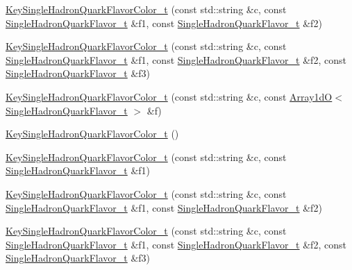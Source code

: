 \begin{DoxyCompactItemize}
\item 
\mbox{\hyperlink{structHadron_1_1KeySingleHadronQuarkFlavorColor__t_a1a1acbb421e0eee78a6102a9dc7027b6}{Key\+Single\+Hadron\+Quark\+Flavor\+Color\+\_\+t}} (const std\+::string \&c, const \mbox{\hyperlink{structHadron_1_1SingleHadronQuarkFlavor__t}{Single\+Hadron\+Quark\+Flavor\+\_\+t}} \&f1, const \mbox{\hyperlink{structHadron_1_1SingleHadronQuarkFlavor__t}{Single\+Hadron\+Quark\+Flavor\+\_\+t}} \&f2)
\item 
\mbox{\hyperlink{structHadron_1_1KeySingleHadronQuarkFlavorColor__t_aa59b67de7070dc5fcab6ef768af7069e}{Key\+Single\+Hadron\+Quark\+Flavor\+Color\+\_\+t}} (const std\+::string \&c, const \mbox{\hyperlink{structHadron_1_1SingleHadronQuarkFlavor__t}{Single\+Hadron\+Quark\+Flavor\+\_\+t}} \&f1, const \mbox{\hyperlink{structHadron_1_1SingleHadronQuarkFlavor__t}{Single\+Hadron\+Quark\+Flavor\+\_\+t}} \&f2, const \mbox{\hyperlink{structHadron_1_1SingleHadronQuarkFlavor__t}{Single\+Hadron\+Quark\+Flavor\+\_\+t}} \&f3)
\item 
\mbox{\hyperlink{structHadron_1_1KeySingleHadronQuarkFlavorColor__t_aa894166327f6565a8ec49fd863dadf47}{Key\+Single\+Hadron\+Quark\+Flavor\+Color\+\_\+t}} (const std\+::string \&c, const \mbox{\hyperlink{classADAT_1_1Array1dO}{Array1dO}}$<$ \mbox{\hyperlink{structHadron_1_1SingleHadronQuarkFlavor__t}{Single\+Hadron\+Quark\+Flavor\+\_\+t}} $>$ \&f)
\item 
\mbox{\hyperlink{structHadron_1_1KeySingleHadronQuarkFlavorColor__t_acd4b45c7be8c3465db55bcddff1c4617}{Key\+Single\+Hadron\+Quark\+Flavor\+Color\+\_\+t}} ()
\item 
\mbox{\hyperlink{structHadron_1_1KeySingleHadronQuarkFlavorColor__t_ab47ad45a431348bc0ac3c90a670a440a}{Key\+Single\+Hadron\+Quark\+Flavor\+Color\+\_\+t}} (const std\+::string \&c, const \mbox{\hyperlink{structHadron_1_1SingleHadronQuarkFlavor__t}{Single\+Hadron\+Quark\+Flavor\+\_\+t}} \&f1)
\item 
\mbox{\hyperlink{structHadron_1_1KeySingleHadronQuarkFlavorColor__t_a1a1acbb421e0eee78a6102a9dc7027b6}{Key\+Single\+Hadron\+Quark\+Flavor\+Color\+\_\+t}} (const std\+::string \&c, const \mbox{\hyperlink{structHadron_1_1SingleHadronQuarkFlavor__t}{Single\+Hadron\+Quark\+Flavor\+\_\+t}} \&f1, const \mbox{\hyperlink{structHadron_1_1SingleHadronQuarkFlavor__t}{Single\+Hadron\+Quark\+Flavor\+\_\+t}} \&f2)
\item 
\mbox{\hyperlink{structHadron_1_1KeySingleHadronQuarkFlavorColor__t_aa59b67de7070dc5fcab6ef768af7069e}{Key\+Single\+Hadron\+Quark\+Flavor\+Color\+\_\+t}} (const std\+::string \&c, const \mbox{\hyperlink{structHadron_1_1SingleHadronQuarkFlavor__t}{Single\+Hadron\+Quark\+Flavor\+\_\+t}} \&f1, const \mbox{\hyperlink{structHadron_1_1SingleHadronQuarkFlavor__t}{Single\+Hadron\+Quark\+Flavor\+\_\+t}} \&f2, const \mbox{\hyperlink{structHadron_1_1SingleHadronQuarkFlavor__t}{Single\+Hadron\+Quark\+Flavor\+\_\+t}} \&f3)

\end{DoxyCompactItemize}
